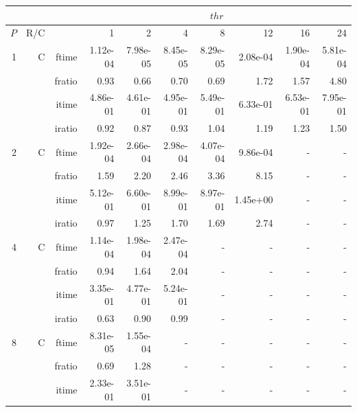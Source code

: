 \documentclass[a4paper]{article}
\begin{document}
\begin{table}[htbp]
\begin{center}
\begin{small}
\begin{tabular}{|r|r|r|r|r|r|r|r|r|r|}
\hline 
     & & & \multicolumn{7}{c|}{$thr$} \\ \hline
    $P$ & R/C &  & 1           & 2    & 4    & 8    & 12   & 16    & 24  \\ \hline\hline
     1 & C & ftime & 1.12e-04 & 7.98e-05 & 8.45e-05 & 8.29e-05 & 2.08e-04 & 1.90e-04 & 5.81e-04 \\   
          &      & fratio & 0.93 & 0.66 & 0.70 & 0.69 & 1.72 & 1.57 & 4.80 \\   
          &      & itime & 4.86e-01 & 4.61e-01 & 4.95e-01 & 5.49e-01 & 6.33e-01 & 6.53e-01 & 7.95e-01 \\   
          &      & iratio & 0.92 & 0.87 & 0.93 & 1.04 & 1.19 & 1.23 & 1.50 \\ \hline 
     2 & C & ftime & 1.92e-04 & 2.66e-04 & 2.98e-04 & 4.07e-04 & 9.86e-04 &     -     &     -     \\   
          &      & fratio & 1.59 & 2.20 & 2.46 & 3.36 & 8.15 &     -     &     -     \\   
          &      & itime & 5.12e-01 & 6.60e-01 & 8.99e-01 & 8.97e-01 & 1.45e+00 &     -     &     -     \\   
          &      & iratio & 0.97 & 1.25 & 1.70 & 1.69 & 2.74 &     -     &     -     \\ \hline 
     4 & C & ftime & 1.14e-04 & 1.98e-04 & 2.47e-04 &     -     &     -     &     -     &     -     \\   
          &      & fratio & 0.94 & 1.64 & 2.04 &     -     &     -     &     -     &     -     \\   
          &      & itime & 3.35e-01 & 4.77e-01 & 5.24e-01 &     -     &     -     &     -     &     -     \\   
          &      & iratio & 0.63 & 0.90 & 0.99 &     -     &     -     &     -     &     -     \\ \hline 
     8 & C & ftime & 8.31e-05 & 1.55e-04 &     -     &     -     &     -     &     -     &     -     \\   
          &      & fratio & 0.69 & 1.28 &     -     &     -     &     -     &     -     &     -     \\   
          &      & itime & 2.33e-01 & 3.51e-01 &     -     &     -     &     -     &     -     &     -     \\   

\end{tabular}
\end{small}
\end{center}
\end{table}
\end{document}
